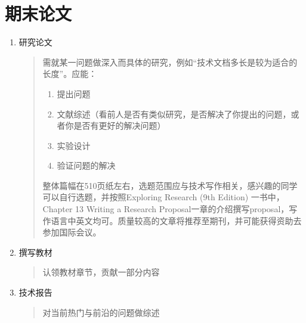 \documentclass[letterpaper,10pt,english]{sphinxmanual}
\begin{document}
\section{期末论文}
\label{\detokenize{about/syllabus-cat:id3}}\begin{enumerate}
%
\item {} 
\sphinxAtStartPar
研究论文
\begin{quote}

\sphinxAtStartPar
需就某一问题做深入而具体的研究，例如“技术文档多长是较为适合的长度”。应能：
\begin{enumerate}
%
\item {} 
\sphinxAtStartPar
提出问题

\item {} 
\sphinxAtStartPar
文献综述（看前人是否有类似研究，是否解决了你提出的问题，或者你是否有更好的解决问题）

\item {} 
\sphinxAtStartPar
实验设计

\item {} 
\sphinxAtStartPar
验证问题的解决

\end{enumerate}

\sphinxAtStartPar
整体篇幅在5\sphinxhyphen{}10页纸左右，选题范围应与技术写作相关，感兴趣的同学可以自行选题，并按照Exploring Research (9th Edition) 一书中，Chapter 13 Writing a Research Proposal一章的介绍撰写proposal，写作语言中英文均可。质量较高的文章将推荐至期刊，并可能获得资助去参加国际会议。
\end{quote}

\item {} 
\sphinxAtStartPar
撰写教材
\begin{quote}

\sphinxAtStartPar
认领教材章节，贡献一部分内容
\end{quote}

\item {} 
\sphinxAtStartPar
技术报告
\begin{quote}

\sphinxAtStartPar
对当前热门与前沿的问题做综述
\end{quote}

\end{enumerate}

\sphinxstepscope
\end{document}
